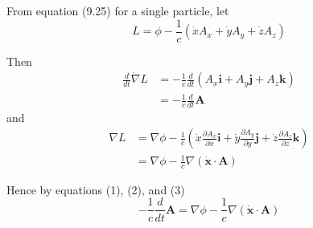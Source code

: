 \documentclass[12pt]{article}
\begin{document}
From equation (9.25) for a single particle, let
\begin{equation*}
L=\phi-\frac{1}{c}(\dot xA_x+\dot yA_y+\dot zA_z)
\end{equation*}

Then
\begin{align*}
\frac{d}{dt}\dot\nabla L
&=-\frac{1}{c}\frac{d}{dt}(A_x\mathbf i+A_y\mathbf j+A_z\mathbf k)
\\[1ex]
&=-\frac{1}{c}\frac{d}{dt}\mathbf A
\tag{2}
\end{align*}
and
\begin{align*}
\nabla L
&=\nabla\phi-\frac{1}{c}
\left(
\dot x\frac{\partial A_x}{\partial x}\mathbf i
+\dot y\frac{\partial A_y}{\partial y}\mathbf j
+\dot z\frac{\partial A_z}{\partial z}\mathbf k
\right)
\\
&=\nabla\phi-\frac{1}{c}\nabla(\dot{\mathbf x}\cdot\mathbf A)
\tag{3}
\end{align*}

Hence by equations (1), (2), and (3)
\begin{equation*}
-\frac{1}{c}\frac{d}{dt}\mathbf A=\nabla\phi
-\frac{1}{c}\nabla(\dot{\mathbf x}\cdot\mathbf A)
\end{equation*}

\end{document}
